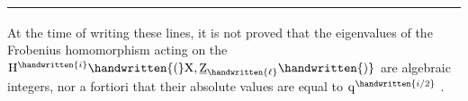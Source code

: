 \begin{minipage}{\linewidth}
\smallskip
\noindent\rule{0.32\linewidth}{0.4pt}\par
{\footnotesize\noindent\textsuperscript{}\quad At the time of writing these lines, it is not proved that the eigenvalues of the Frobenius homomorphism acting on the $\mathrm{H}^{\handwritten{i}}\handwritten{(}\mathrm{X},\underline{\mathrm{Z}}_{\handwritten{\ell}}\handwritten{)}$ are algebraic integers, nor a fortiori that their absolute values are equal to $\mathrm{q}^{\handwritten{i/2}}$ .\par}
\end{minipage}
